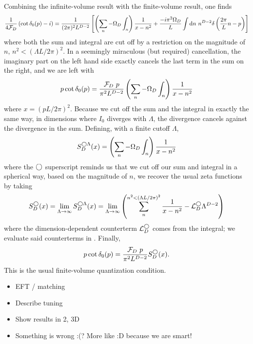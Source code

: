 Combining the infinite-volume result with the finite-volume result, one finds
\begin{equation}
    \frac{1}{4\mathcal{F}_D}\left(\cot \delta_0(p) - i\right) = \frac{1}{(2\pi)^2 L^{D-2}}\left[ \left(\sum_n- \Omega_D\int_n\right) \frac{1}{x-n^2} + \frac{-i \pi^2\Omega_D}{L} \int \mathrm{d}n\ n^{D-2} \delta\left(\frac{2\pi}{L}n - p\right) \right]
\end{equation}
where both the sum and integral are cut off by a restriction on the magnitude of $n$, $n^2 < (\Lambda L / 2\pi)^2$.
In a seemingly miraculous (but required) cancellation, the imaginary part on the left hand side exactly cancels the last term in the sum on the right, and we are left with
\begin{equation}
    p \cot \delta_0(p) = \frac{\mathcal{F}_D\ p}{\pi^2 L^{D-2}} \left(\sum_n- \Omega_D\int_n\right) \frac{1}{x-n^2}
\end{equation}
where $x=(pL/2\pi)^2$.
Because we cut off the sum and the integral in exactly the same way, in dimensions where $I_0$ diverges with $\Lambda$, the divergence cancels against the divergence in the sum.
Defining, with a finite cutoff $\Lambda$,
\begin{equation}\label{eq:spherical cutoff S}
    S^{\bigcirc\Lambda}_D(x) = \left(\sum_n- \Omega_D\int_n\right) \frac{1}{x-n^2}
\end{equation}
where the $\bigcirc$ superscript reminds us that we cut off our sum and integral in a spherical way, based on the magnitude of $n$, we recover the usual \Luscher zeta functions by taking
\begin{equation}
    S^\bigcirc_D(x)
    =
    \lim_{\Lambda\rightarrow\infty} S^{\bigcirc\Lambda}_D(x)
    =
    \lim_{\Lambda\rightarrow\infty}\left( \sum_n^{n^2 < (\Lambda L/2\pi)^2} \frac{1}{x-n^2} - \mathcal{L}_D^\bigcirc \Lambda^{D-2}\right)
\end{equation}
where the dimension-dependent counterterm $\mathcal{L}_D^\bigcirc$ comes from the integral; we evaluate said counterterms in .
Finally,
\begin{equation}\label{eq:spherical quantization}
    p \cot \delta_0(p) = \frac{\mathcal{F}_D\ p}{\pi^2 L^{D-2}} S^\bigcirc_D(x).
\end{equation}
This is the usual \Luscher finite-volume quantization condition.

\begin{itemize}
    \item EFT / matching
    \item Describe tuning
    \item Show results in 2, 3D
    \item Something is wrong :(?  More like :D because we are smart!
\end{itemize}
